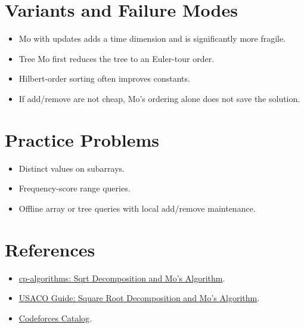 \section*{Variants and Failure Modes}

\begin{itemize}
  \item Mo with updates adds a time dimension and is significantly more fragile.
  \item Tree Mo first reduces the tree to an Euler-tour order.
  \item Hilbert-order sorting often improves constants.
  \item If add/remove are not cheap, Mo's ordering alone does not save the solution.
\end{itemize}

\section*{Practice Problems}

\begin{itemize}
  \item Distinct values on subarrays.
  \item Frequency-score range queries.
  \item Offline array or tree queries with local add/remove maintenance.
\end{itemize}

\section*{References}

\begin{itemize}
  \item \href{https://cp-algorithms.com/data_structures/sqrt_decomposition.html}{cp-algorithms: Sqrt Decomposition and Mo's Algorithm}.
  \item \href{https://usaco.guide/plat/sqrt}{USACO Guide: Square Root Decomposition and Mo's Algorithm}.
  \item \href{https://codeforces.com/catalog}{Codeforces Catalog}.
\end{itemize}

